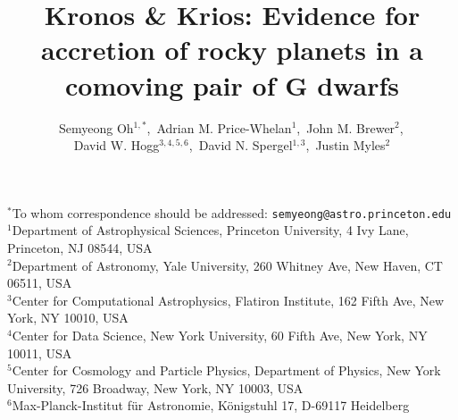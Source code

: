 \documentclass[12pt,letterpaper,margin=1in]{article}
\title{
\vspace{-2cm}
  Kronos \& Krios: Evidence for accretion of rocky planets in a comoving pair of G dwarfs
}
\author{
  Semyeong Oh$^{1,*}$,\,
  Adrian M. Price-Whelan$^{1}$,\,
  John M. Brewer$^{2}$,\,\\
  David W. Hogg$^{3,4,5,6}$,\,
  David N. Spergel$^{1,3}$,\,
  Justin Myles$^{2}$
}
\begin{document}
\sloppy\sloppypar\raggedbottom\frenchspacing %
\maketitle

{\small\noindent
  $^*$To whom correspondence should be addressed: \texttt{semyeong@astro.princeton.edu} \\
  $^1$Department of Astrophysical Sciences, Princeton University, 4 Ivy Lane, Princeton, NJ 08544, USA \\
  $^2$Department of Astronomy, Yale University, 260 Whitney Ave, New Haven, CT 06511, USA \\
  $^3$Center for Computational Astrophysics, Flatiron Institute, 162 Fifth Ave, New York, NY 10010, USA \\
  $^4$Center for Data Science, New York University, 60 Fifth Ave, New York, NY 10011, USA \\
  $^5$Center for Cosmology and Particle Physics, Department of Physics, New York University, 726 Broadway, New York, NY 10003, USA \\
  $^6$Max-Planck-Institut f\"ur Astronomie, K\"onigstuhl 17, D-69117 Heidelberg \\
}





\end{document}
